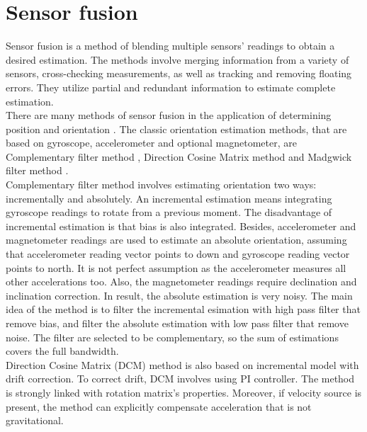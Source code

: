 \chapter{Sensor fusion}

Sensor fusion is a method of blending multiple sensors’ readings to obtain a desired estimation. The methods involve merging information from a variety of sensors, cross-checking measurements, as well as tracking and removing floating errors. They utilize partial and redundant information to estimate complete estimation.\\

There are many methods of sensor fusion in the application of determining position and orientation \cite{uav}. The classic orientation estimation methods, that are based on gyroscope, accelerometer and optional magnetometer, are Complementary filter method \cite{complementary}, Direction Cosine Matrix method \cite{dcm} and Madgwick filter method \cite{madgwick}. \\

Complementary filter method involves estimating orientation two ways: incrementally and absolutely. An incremental estimation means integrating gyroscope readings to rotate from a previous moment. The disadvantage of incremental estimation is that bias is also integrated. Besides, accelerometer and magnetometer readings are used to estimate an absolute orientation, assuming that accelerometer reading vector points to down and gyroscope reading vector points to north. It is not perfect assumption as the accelerometer measures all other accelerations too. Also, the magnetometer readings require declination and inclination correction. In result, the absolute estimation is very noisy. The main idea of the method is to filter the incremental esimation with high pass filter that remove bias, and filter the absolute estimation with low pass filter that remove noise. The filter are selected to be complementary, so the sum of estimations covers the full bandwidth.\\

Direction Cosine Matrix (DCM) method is also based on incremental model with drift correction.
To correct drift, DCM involves using PI controller. The method is strongly linked with rotation matrix's properties. Moreover, if velocity source is present, the method can explicitly compensate acceleration that is not gravitational. \\

